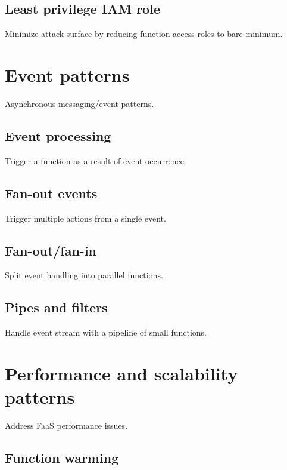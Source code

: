 \subsection{Least privilege IAM role} \label{subsubsec:LeastprivilegeIAMrole}

Minimize attack surface by reducing function access roles to bare minimum.

\section{Event patterns} \label{sec:eventPatterns}

Asynchronous messaging/event patterns.

\subsection{Event processing} \label{subsubsec:Eventprocessing}

Trigger a function as a result of event occurrence.

\subsection{Fan-out events} \label{subsubsec:FanoutEvents}

Trigger multiple actions from a single event.

\subsection{Fan-out/fan-in} \label{subsubsec:FanoutFanin}

Split event handling into parallel functions.

\subsection{Pipes and filters} \label{subsubsec:PipesAndFilters}

Handle event stream with a pipeline of small functions.

\section{Performance and scalability patterns} \label{sec:perfPatterns}

Address FaaS performance issues.

\subsection{Function warming} \label{subsubsec:FunctionWarming}

